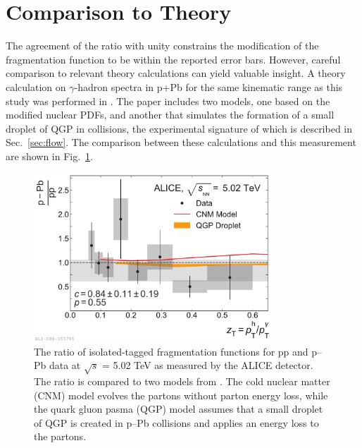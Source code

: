 \section{Comparison to Theory}
The agreement of the ratio with unity constrains the modification of the fragmentation function to be within the reported error bars. However, careful comparison to relevant theory calculations can yield valuable insight. A theory calculation on $\gamma$-hadron spectra in p+Pb for the same kinematic range as this study was performed in \cite{Xie2021}. The paper includes two models, one based on the modified nuclear PDFs, and another that simulates the formation of a small droplet of QGP in \pPb collisions, the experimental signature of which is described in Sec.~\ref{sec:flow}. The comparison between these calculations and this measurement are shown in Fig.~\ref{fig:FF_model}.
\begin{figure}[htpb]
  \centering
  \includegraphics[width=0.8\textwidth]{FF_Model_Comparisons_Ratio.pdf}
  \caption{The ratio of isolated-tagged fragmentation functions for pp and p–Pb data at $\sqrt{s}$ = 5.02 TeV as measured by the ALICE detector.  The ratio is compared to two models from \cite{Xie2021}. The cold nuclear matter (CNM) model evolves the partons without parton energy loss, while the quark gluon pasma (QGP) model assumes that a small droplet of QGP is created in p–Pb collisions and applies an energy loss to the partons.}
  \label{fig:FF_model}
\end{figure}

